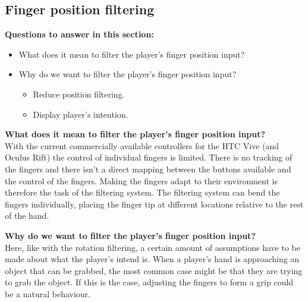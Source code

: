 
\subsection{Finger position filtering}
\label{subsec:categoryFingerFiltering}
\textbf{Questions to answer in this section:}
\begin{itemize}
\item What does it mean to filter the player's finger position input?
\item Why do we want to filter the player's finger position input?
\begin{itemize}
\item Reduce position filtering.
\item Display player's intention.
\end{itemize}
\end{itemize}

\textbf{What does it mean to filter the player's finger position input?}\\
With the current commercially available controllers for the HTC Vive (and Oculus Rift) the control of individual fingers is limited. There is no tracking of the fingers and there isn't a direct mapping between the buttons available and the control of the fingers. Making the fingers adapt to their environment is therefore the task of the filtering system. The filtering system can bend the fingers individually, placing the finger tip at different locations relative to the rest of the hand.

\textbf{Why do we want to filter the player's finger position input?}\\
Here, like with the rotation filtering, a certain amount of assumptions have to be made about what the player's intend is. When a player's hand is approaching an object that can be grabbed, the most common case might be that they are trying to grab the object. If this is the case, adjusting the fingers to form a grip could be a natural behaviour.

